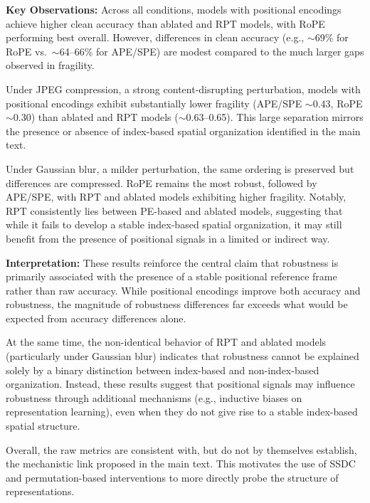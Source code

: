 \documentclass{article}
\begin{document}
  \textbf{Key Observations:}
  Across all conditions, models with positional encodings achieve higher clean accuracy than ablated and RPT models, with RoPE performing best overall. However, differences in clean accuracy (e.g., $\sim$69\% for RoPE vs.\ $\sim$64--66\% for APE/SPE) are modest compared to the much larger gaps observed in fragility.

  Under JPEG compression, a strong content-disrupting perturbation, models with positional encodings exhibit substantially lower fragility (APE/SPE $\sim$0.43, RoPE $\sim$0.30) than ablated and RPT models ($\sim$0.63--0.65). This large separation mirrors the presence or absence of index-based spatial organization identified in the main text.

  Under Gaussian blur, a milder perturbation, the same ordering is preserved but differences are compressed. RoPE remains the most robust, followed by APE/SPE, with RPT and ablated models exhibiting higher fragility. Notably, RPT consistently lies between PE-based and ablated models, suggesting that while it fails to develop a stable index-based spatial organization, it may still benefit from the presence of positional signals in a limited or indirect way.

  \textbf{Interpretation:}
  These results reinforce the central claim that robustness is primarily associated with the presence of a stable positional reference frame rather than raw accuracy. While positional encodings improve both accuracy and robustness, the magnitude of robustness differences far exceeds what would be expected from accuracy differences alone.

  At the same time, the non-identical behavior of RPT and ablated models (particularly under Gaussian blur) indicates that robustness cannot be explained solely by a binary distinction between index-based and non-index-based organization. Instead, these results suggest that positional signals may influence robustness through additional mechanisms (e.g., inductive biases on representation learning), even when they do not give rise to a stable index-based spatial structure.

  Overall, the raw metrics are consistent with, but do not by themselves establish, the mechanistic link proposed in the main text. This motivates the use of SSDC and permutation-based interventions to more directly probe the structure of representations.



\newpage

\end{document}
